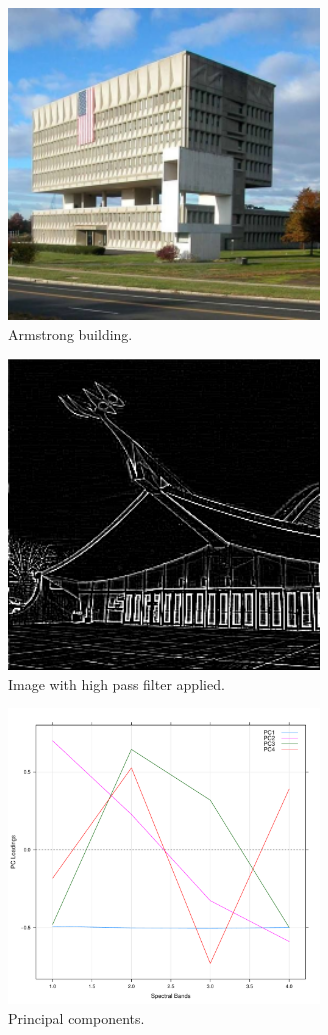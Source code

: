 \documentclass[conference,compsoc]{IEEEtran}
\begin{document}
\begin{figure}[!t]
\centering
\includegraphics[width=3.25in]{armstrong.png}
\caption{Armstrong building.}
\label{armstrong}
\end{figure}

\begin{figure}[!t]
\centering
\includegraphics[width=3.25in]{ingalls-high-pass.png}
\caption{Image with high pass filter applied.}
\label{ingalls-high-pass}
\end{figure}

\begin{figure}[!t]
\centering
\includegraphics[width=3.25in]{pca-plot.pdf}
\caption{Principal components.}
\label{pca-plot}
\end{figure}
\end{document}
